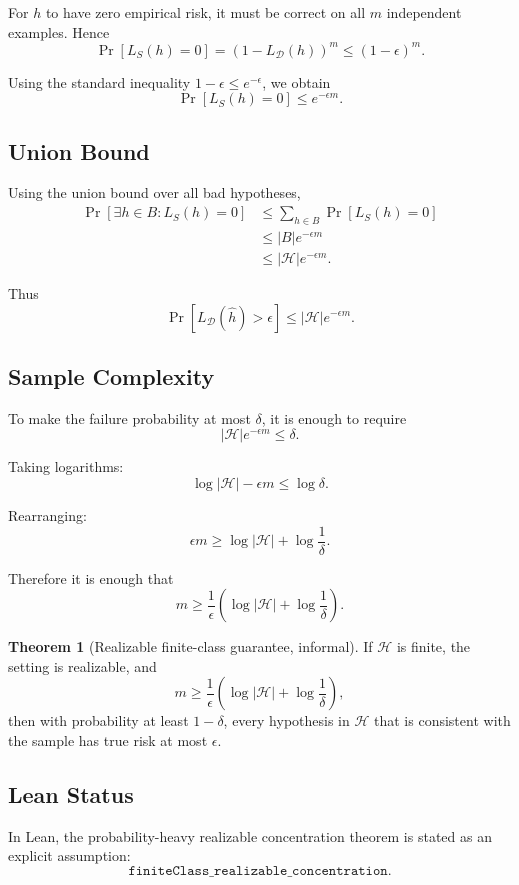 \documentclass[11pt]{article}
\newcommand{\Hclass}{\mathcal{H}}
\newcommand{\Ddist}{\mathcal{D}}
\newcommand{\LD}{L_{\Ddist}}
\newcommand{\LS}{L_S}
\newcommand{\hh}{\widehat{h}}
\newcommand{\eps}{\epsilon}
\theoremstyle{definition}
\newtheorem{theorem}{Theorem}
\begin{document}
For $h$ to have zero empirical risk, it must be correct on all $m$ independent
examples. Hence
\[
  \Pr[\LS(h)=0]
  =
  (1-\LD(h))^m
  \le
  (1-\eps)^m.
\]

Using the standard inequality $1-\eps\le e^{-\eps}$, we obtain
\[
  \Pr[\LS(h)=0]\le e^{-\eps m}.
\]

\subsection{Union Bound}

Using the union bound over all bad hypotheses,
\[
\begin{aligned}
  \Pr[\exists h\in B : \LS(h)=0]
  &\le \sum_{h\in B}\Pr[\LS(h)=0] \\
  &\le |B|e^{-\eps m} \\
  &\le |\Hclass|e^{-\eps m}.
\end{aligned}
\]

Thus
\[
  \Pr[\LD(\hh)>\eps]\le |\Hclass|e^{-\eps m}.
\]

\subsection{Sample Complexity}

To make the failure probability at most $\delta$, it is enough to require
\[
  |\Hclass|e^{-\eps m}\le \delta.
\]

Taking logarithms:
\[
  \log|\Hclass|-\eps m\le \log\delta.
\]

Rearranging:
\[
  \eps m \ge \log|\Hclass|+\log\frac{1}{\delta}.
\]

Therefore it is enough that
\[
  m\ge
  \frac{1}{\eps}
  \left(
    \log|\Hclass|+\log\frac{1}{\delta}
  \right).
\]

\begin{theorem}[Realizable finite-class guarantee, informal]
If $\Hclass$ is finite, the setting is realizable, and
\[
  m\ge
  \frac{1}{\eps}
  \left(
    \log|\Hclass|+\log\frac{1}{\delta}
  \right),
\]
then with probability at least $1-\delta$, every hypothesis in $\Hclass$ that is
consistent with the sample has true risk at most $\eps$.
\end{theorem}

\subsection{Lean Status}

In Lean, the probability-heavy realizable concentration theorem is stated as an
explicit assumption:
\[
  \texttt{finiteClass\_realizable\_concentration}.
\]
\end{document}
